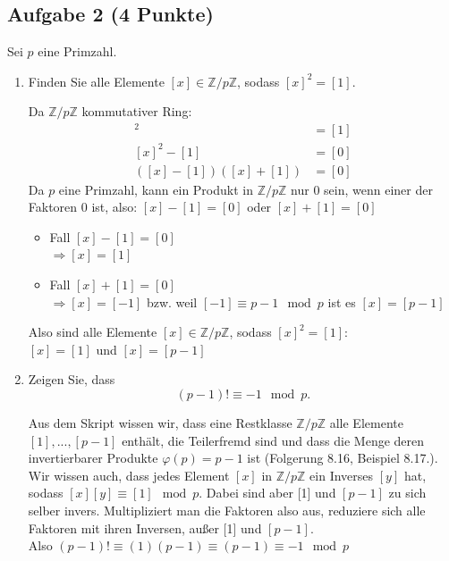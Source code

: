 \documentclass{article} %
\begin{document}
\subsection*{Aufgabe 2 (4 Punkte)}
Sei $p$ eine Primzahl.
\begin{enumerate}
    \item[(a)] Finden Sie alle Elemente $[x] \in \mathbb{Z}/p\mathbb{Z}$, sodass $[x]^2 = [1]$.
    \begin{mybox}
    Da $\mathbb{Z}/p\mathbb{Z}$ kommutativer Ring: 
    \begin{align*}
        [x]^2 & = [1] \\
        [x]^2-[1] & = [0] \\
        ([x]-[1])([x]+[1])& = [0]
    \end{align*}
    Da $p$ eine Primzahl, kann ein Produkt in $\mathbb{Z}/p\mathbb{Z}$ nur 0 sein, wenn einer der Faktoren 0 ist, also: 
    $[x]-[1]=[0]$ oder $[x]+[1]=[0]$
    \begin{itemize}
        \item Fall $[x]-[1]=[0]$ \\
        $\Rightarrow [x]=[1]$
        \item Fall $[x]+[1]=[0]$ \\
        $\Rightarrow [x]=[-1]$ bzw. weil $ [-1] \equiv p-1 \mod p$ ist es $[x]=[p-1]$
    \end{itemize}
    Also sind alle Elemente $[x] \in \mathbb{Z}/p\mathbb{Z}$, sodass $[x]^2 = [1]$: \\
    $[x]=[1]$ und $[x]=[p-1]$
    \end{mybox}
    \item[(b)] Zeigen Sie, dass
    \[(p - 1)! \equiv -1 \mod p.\]
    \begin{mybox}
    Aus dem Skript wissen wir, dass eine Restklasse $\mathbb{Z}/p\mathbb{Z}$ alle Elemente $[1], ..., [p-1]$ enthält, die Teilerfremd sind und dass die Menge deren invertierbarer Produkte $\varphi(p) = p-1$ ist  (Folgerung 8.16, Beispiel 8.17.). \\ \newline 
    Wir wissen auch, dass jedes Element $[x]$ in $\mathbb{Z}/p\mathbb{Z}$ ein Inverses $[y]$ hat, sodass $[x][y]\equiv [1] \mod p$. Dabei sind aber [1] und $[p-1]$ zu sich selber invers. Multipliziert man die Faktoren also aus, reduziere sich alle Faktoren mit ihren Inversen, außer [1] und $[p-1]$. \\
    Also $(p-1)! \equiv (1)(p-1) \equiv  (p-1) \equiv  -1 \mod p$
    \end{mybox}
\end{enumerate}
\newpage
\end{document}
